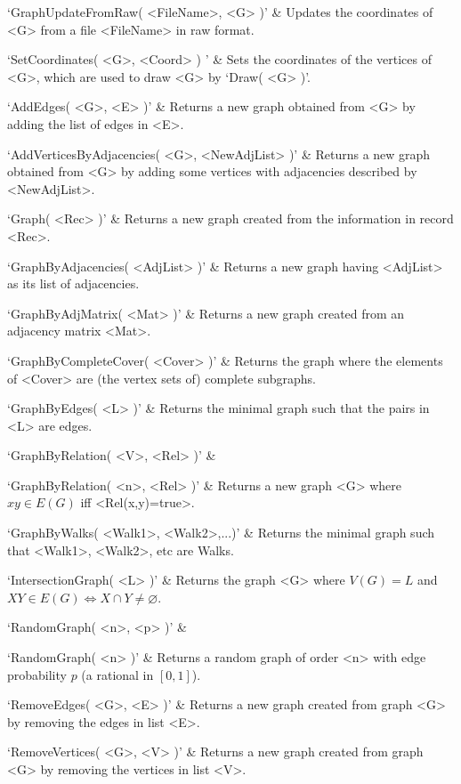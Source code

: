 `GraphUpdateFromRaw( <FileName>, <G> )' &
Updates  the  coordinates  of  <G>  from  a file <FileName> in raw format.

`SetCoordinates( <G>, <Coord> ) ' &
Sets  the  coordinates  of the vertices of <G>, which are used to draw <G> by `Draw( <G> )'.
\enditems


\beginitems
`AddEdges( <G>, <E> )' & 
Returns a new graph obtained from <G> by adding the list of edges in <E>.

`AddVerticesByAdjacencies( <G>, <NewAdjList> )' & 
Returns a new graph obtained from <G> by adding some vertices with adjacencies described by <NewAdjList>.

`Graph( <Rec> )' & 
Returns  a  new  graph  created  from  the  information in record  <Rec>.

`GraphByAdjacencies( <AdjList> )' & 
Returns  a  new  graph  having  <AdjList>  as its list of adjacencies.

`GraphByAdjMatrix( <Mat> )' & 
Returns  a  new  graph  created from an adjacency matrix <Mat>.

`GraphByCompleteCover( <Cover> )' & 
Returns the graph where the elements of <Cover> are (the vertex sets of) complete subgraphs.

`GraphByEdges( <L> )' & 
Returns the minimal graph such that the pairs in <L> are edges.

`GraphByRelation( <V>, <Rel> )' & 

`GraphByRelation( <n>, <Rel> )' & 
Returns  a  new  graph  <G> where $xy \in E(G)$ iff <Rel(x,y)=true>.

`GraphByWalks( <Walk1>, <Walk2>,...)' & 
Returns the minimal graph such that <Walk1>, <Walk2>, etc are Walks.

`IntersectionGraph( <L> )' & 
Returns the graph <G> where $V(G)=L$ and $XY\in E(G) \iff X\cap Y \neq \varnothing$.

`RandomGraph( <n>, <p> )' & 

`RandomGraph( <n> )' & 
Returns a random graph of order <n> with edge probability $p$ (a rational in $[0,1]$).

`RemoveEdges( <G>, <E> )' & 
Returns  a  new graph created from graph <G> by removing the edges in list <E>.

`RemoveVertices( <G>, <V> )' & 
Returns  a  new  graph  created from graph <G> by removing the vertices in list <V>.
\enditems


